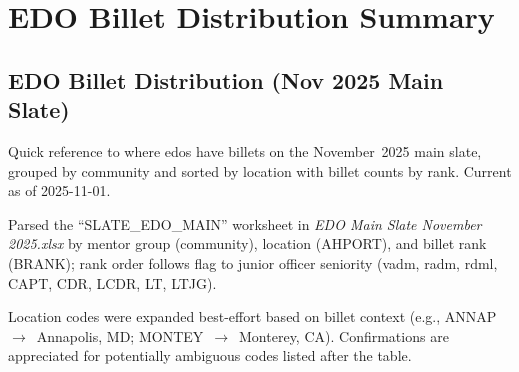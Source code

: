 \documentclass[../main.tex]{subfiles}
\begin{document}

\chapter{EDO Billet Distribution Summary}

\section{EDO Billet Distribution (Nov 2025 Main Slate)}\label{app:edo-billet-distribution}
\begin{description}[style=nextline, labelsep=0.5em, font=\bfseries]
  \item[\textbf{Purpose.}] Quick reference to where \acp{edo} have billets on the November~2025 main slate, grouped by community and sorted by location with billet counts by rank. Current as of 2025-11-01.
  \item[\textbf{Method.}] Parsed the ``SLATE\_EDO\_MAIN'' worksheet in \emph{EDO Main Slate November 2025.xlsx} by mentor group (community), location (AHPORT), and billet rank (BRANK); rank order follows flag to junior officer seniority (\acs{vadm}, \acs{radm}, \acs{rdml}, CAPT, CDR, LCDR, LT, LTJG).
  \item[\textbf{Location expansions.}] Location codes were expanded best-effort based on billet context (e.g., ANNAP~$\rightarrow$~Annapolis, MD; MONTEY~$\rightarrow$~Monterey, CA). Confirmations are appreciated for potentially ambiguous codes listed after the table.
\end{description}
\end{document}
